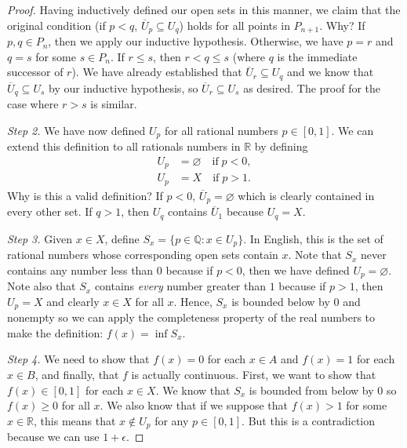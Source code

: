 \documentclass{article}
\newcommand{\nline}{\vspace*{0.5\baselineskip}}
\theoremstyle{definition}
\begin{document}
\begin{flushleft}
\begin{proof}
\nline

Having inductively defined our open sets in this manner, we claim that the original condition (if $p < q$, $\overline{U}_p \subseteq U_q$) holds for all points in $P_{n+1}$. Why? If $p, q \in P_n$, then we apply our inductive hypothesis. Otherwise, we have $p=r$ and $q = s$ for some $s \in P_n$. If $r \leq s$, then $r < q \leq s$ (where $q$ is the immediate successor of $r$). We have already established that $\overline{U}_r \subseteq U_q$ and we know that $\overline{U}_q \subseteq U_s$ by our inductive hypothesis, so $\overline{U}_r \subseteq U_s$ as desired. The proof for the case where $r > s$ is similar.

\nline

\textit{Step 2.} We have now defined $U_p$ for all rational numbers $p \in [0,1]$. We can extend this definition to all rationals numbers in $\mathbb{R}$ by defining
\[
\begin{align}
    U_p &= \varnothing \quad \text{if} \; p < 0, \\
    U_p &= X \quad \text{if} \; p > 1.
\end{align}
\]
Why is this a valid definition? If $p < 0$, $\overline{U}_p = \varnothing$ which is clearly contained in every other set. If $q > 1$, then $U_q$ contains $\overline{U}_1$ because $U_q = X$.

\nline

\textit{Step 3.} Given $x \in X$, define $S_x = \{p \in \mathbb{Q} : x \in U_p\}$. In English, this is the set of rational numbers whose corresponding open sets contain $x$. Note that $S_x$ never contains any number less than $0$ because if $p < 0$, then we have defined $U_p = \varnothing$. Note also that $S_x$ contains \textit{every} number greater than $1$ because if $p > 1$, then $U_p = X$ and clearly $x \in X$ for all $x$. Hence, $S_x$ is bounded below by $0$ and nonempty so we can apply the completeness property of the real numbers to make the definition: $f(x) = \inf S_x$.

\nline

\textit{Step 4.} We need to show that $f(x) = 0$ for each $x \in A$ and $f(x) = 1$ for each $x \in B$, and finally, that $f$ is actually continuous. First, we want to show that $f(x) \in [0,1]$ for each $x \in X$. We know that $S_x$ is bounded from below by $0$ so $f(x) \geq 0$ for all $x$. We also know that if we suppose that $f(x) > 1$ for some $x \in \mathbb{R}$, this means that $x \notin U_p$ for any $p \in [0,1]$. But this is a contradiction because we can use $1 + \epsilon$. %


\end{proof}
\end{flushleft}
\end{document}
